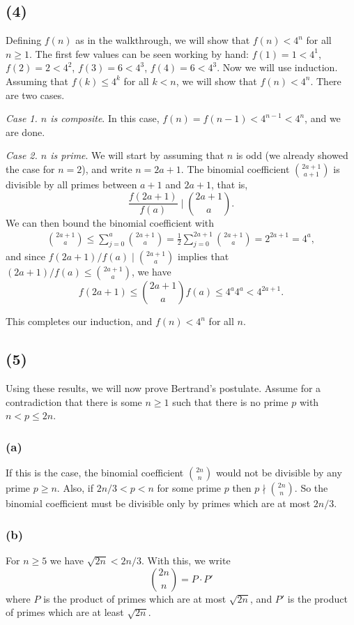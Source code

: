 \documentclass[11pt, a4paper, reqno]{amsart}
\theoremstyle{definition}
\begin{document}
\subsection*{(4)} Defining $f(n)$ as in the walkthrough, we will show that $f(n) < 4^n$ for all $n \geq 1$. The first few values can be seen working by hand: $f(1) = 1 < 4^1$, $f(2) = 2 < 4^2$, $f(3) = 6 < 4^3$, $f(4) = 6 < 4^3$. Now we will use induction. Assuming that $f(k) \leq 4^k$ for all $k < n$, we will show that $f(n) < 4^n$. There are two cases.

\emph{Case 1. $n$ is composite}. In this case, $f(n) = f(n - 1) < 4^{n - 1} < 4^{n}$, and we are done.

\emph{Case 2. $n$ is prime}. We will start by assuming that $n$ is odd (we already showed the case for $n = 2$), and write $n = 2a + 1$. The binomial coefficient $\binom{2a + 1}{a + 1}$ is divisible by all primes between $a + 1$ and $2a + 1$, that is,
$$
	\frac{f(2a + 1)}{f(a)} \mid \binom{2a + 1}{a}.
$$ 
We can then bound the binomial coefficient with
\begin{align*}
	\binom{2a + 1}{a} \leq \sum_{j = 0}^{a} \binom{2a + 1}{a} = \frac{1}{2}\sum_{j = 0}^{2a + 1} \binom{2a + 1}{a} = 2^{2a + 1} = 4^{a},
\end{align*}
and since $f(2a + 1)/f(a) \mid \binom{2a + 1}{a}$ implies that $(2a + 1)/f(a) \leq \binom{2a + 1}{a}$, we have
$$
f(2a + 1) \leq \binom{2a + 1}{a} f(a) \leq 4^{a} 4^{a} < 4^{2a + 1}.
$$

This completes our induction, and $f(n) < 4^n$ for all $n$.

\subsection*{(5)} Using these results, we will now prove Bertrand's postulate.
Assume for a contradiction that there is some $n \geq 1$ such that there is no prime $p$ with $n < p \leq 2n$.

\subsubsection*{(a)} If this is the case, the binomial coefficient $\binom{2n}{n}$ would not be divisible by any prime $p \geq n$. Also, if $2n/3 < p < n$ for some prime $p$ then $p \nmid \binom{2n}{n}$. So the binomial coefficient must be divisible only by primes which are at most $2n/3$.

\subsubsection*{(b)} For $n \geq 5$ we have $\sqrt{2n} < 2n/3$. With this, we write
$$
	\binom{2n}{n} = P\cdot P'
$$
where $P$ is the product of primes which are at most $\sqrt{2n}$, and $P'$ is the product of primes which are at least $\sqrt{2n}$.
\end{document}
